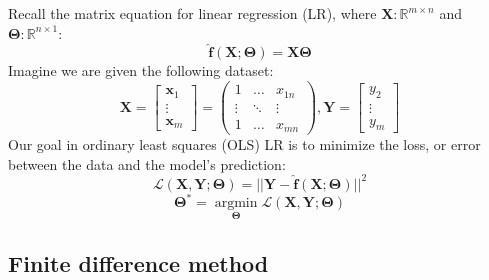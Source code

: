 \noindent Recall the matrix equation for linear regression (LR), where $\mathbf{X}: \mathbb{R}^{m \times n}$ and $\bm\Theta: \mathbb{R}^{n \times 1}$:
%
\begin{equation}\label{eq:lin_reg}
\mathbf{\hat f}(\mathbf{X}; \bm\Theta) = \mathbf{X}\bm\Theta
\end{equation}
%
Imagine we are given the following dataset:
%
\begin{equation}
\mathbf{X} =
\begin{bmatrix}
\mathbf{x}_1 \\
\vdots \\
\mathbf{x}_m
\end{bmatrix} =
\begin{pmatrix}
1 & \ldots & x_{1n} \\
\vdots & \ddots & \vdots \\
1 & \ldots & x_{mn}
\end{pmatrix},
\mathbf{Y} =
\begin{bmatrix}
y_2 \\
\vdots \\
y_m
\end{bmatrix}
\end{equation}
%
Our goal in ordinary least squares (OLS) LR is to minimize the loss, or error between the data and the model's prediction:
%
\begin{equation}
\mathcal{L}(\mathbf{X}, \mathbf{Y}; \bm\Theta) = ||\mathbf{Y} - \mathbf{\hat f}(\mathbf{X}; \bm\Theta)||^2
\end{equation}
%
\begin{equation}
\bm\Theta^* = \underset{\bm\Theta}{\operatorname{argmin}}\mathcal{L}(\mathbf{X}, \mathbf{Y}; \bm\Theta)
\end{equation}

\subsection{Finite difference method}\label{sec:fdm}

